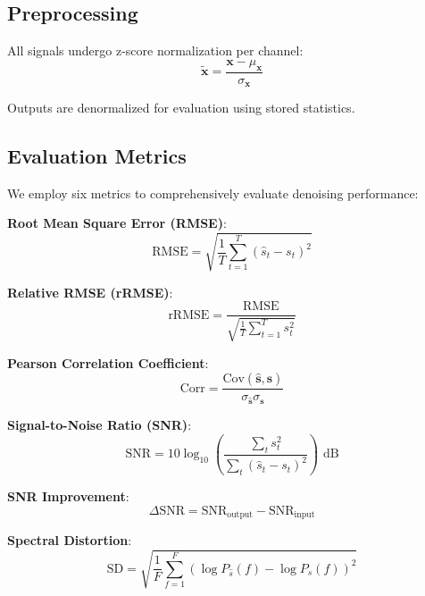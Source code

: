 \documentclass{article}
\begin{document}
\subsection{Preprocessing}

All signals undergo z-score normalization per channel:
\begin{equation}
\tilde{\mathbf{x}} = \frac{\mathbf{x} - \mu_{\mathbf{x}}}{\sigma_{\mathbf{x}}}
\end{equation}

Outputs are denormalized for evaluation using stored statistics.

\subsection{Evaluation Metrics}

We employ six metrics to comprehensively evaluate denoising performance:

\textbf{Root Mean Square Error (RMSE)}:
\begin{equation}
\text{RMSE} = \sqrt{\frac{1}{T}\sum_{t=1}^{T}(\hat{s}_t - s_t)^2}
\end{equation}

\textbf{Relative RMSE (rRMSE)}:
\begin{equation}
\text{rRMSE} = \frac{\text{RMSE}}{\sqrt{\frac{1}{T}\sum_{t=1}^{T}s_t^2}}
\end{equation}

\textbf{Pearson Correlation Coefficient}:
\begin{equation}
\text{Corr} = \frac{\text{Cov}(\hat{\mathbf{s}}, \mathbf{s})}{\sigma_{\hat{\mathbf{s}}} \sigma_{\mathbf{s}}}
\end{equation}

\textbf{Signal-to-Noise Ratio (SNR)}:
\begin{equation}
\text{SNR} = 10 \log_{10}\left(\frac{\sum_t s_t^2}{\sum_t (\hat{s}_t - s_t)^2}\right) \text{ dB}
\end{equation}

\textbf{SNR Improvement}:
\begin{equation}
\Delta\text{SNR} = \text{SNR}_{\text{output}} - \text{SNR}_{\text{input}}
\end{equation}

\textbf{Spectral Distortion}:
\begin{equation}
\text{SD} = \sqrt{\frac{1}{F}\sum_{f=1}^{F}\left(\log P_{\hat{s}}(f) - \log P_s(f)\right)^2}
\end{equation}
\end{document}

